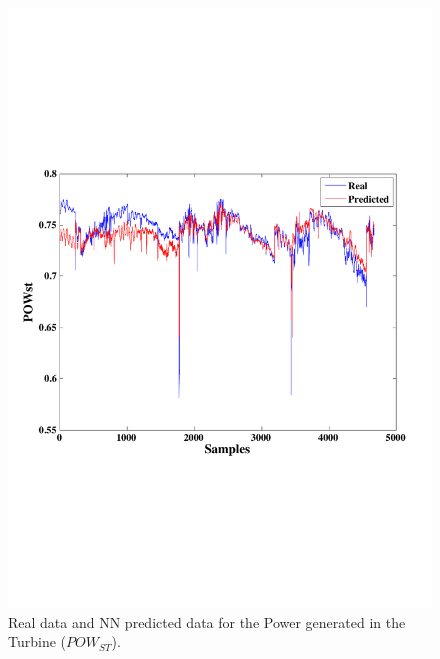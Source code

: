 \begin{figure}
\centering
\includegraphics[width=1\textwidth]{figures/ANN-ST.pdf}
\caption{Real data and NN predicted data for the Power generated in the Turbine ($POW_{ST}$).}
\label{Pturbine}
\end{figure}

